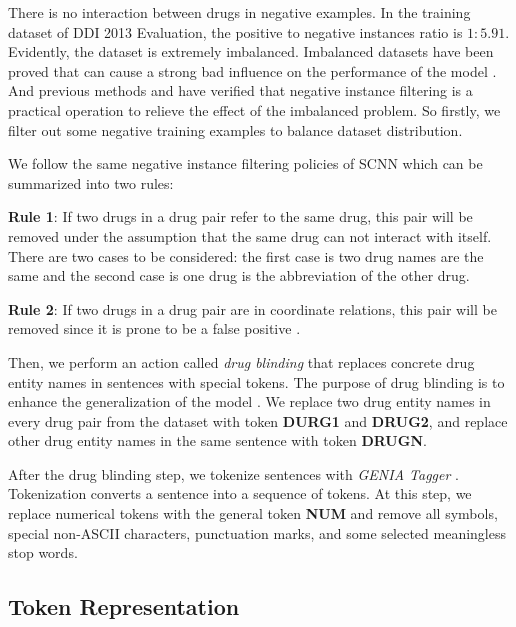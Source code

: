\documentclass[conference]{IEEEtran}
\begin{document}
There is no interaction between drugs in negative examples.
In the training dataset of DDI 2013 Evaluation, the positive to negative instances ratio is $1 \colon 5.91$.
Evidently, the dataset is extremely imbalanced.
Imbalanced datasets have been proved that can cause a strong bad influence on the performance of the model \cite{lopez_insight_2013}.
And previous methods \cite{zhao_drug_2016} and \cite{sahu_drug-drug_2017} have verified that negative instance filtering
is a practical operation to relieve the effect of the imbalanced problem.
So firstly, we filter out some negative training examples to balance dataset distribution.

We follow the same negative instance filtering policies of SCNN \cite{zhao_drug_2016} which can be summarized into two rules:

\begin{framed}
\textbf{Rule 1}: If two drugs in a drug pair refer to the same drug,
this pair will be removed under the assumption that the same drug can not interact with itself.
There are two cases to be considered: the first case is two drug names are the same and the second case is one drug is the abbreviation of the other drug.

\bigbreak

\textbf{Rule 2}: If two drugs in a drug pair are in coordinate relations,
this pair will be removed since it is prone to be a false positive \cite{segura-bedmar_lessons_2014}.
\end{framed}

Then, we perform an action called \emph{drug blinding} that replaces concrete drug entity names in sentences with special tokens.
The purpose of drug blinding is to enhance the generalization of the model \cite{liu_drug-drug_2016}.
We replace two drug entity names in every drug pair from the dataset with token \textbf{DURG1} and \textbf{DRUG2},
and replace other drug entity names in the same sentence with token \textbf{DRUGN}.

After the drug blinding step, we tokenize sentences with \emph{GENIA Tagger} \cite{tsuruoka_genia_2006}.
Tokenization converts a sentence into a sequence of tokens.
At this step, we replace numerical tokens with the general token \textbf{NUM} and remove all symbols,
special non-ASCII characters, punctuation marks, and some selected meaningless stop words.

\subsection{Token Representation}
\end{document}
